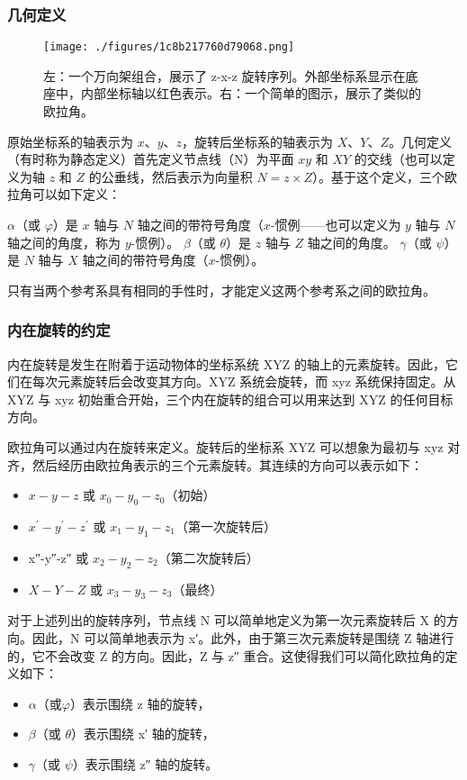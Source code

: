 \subsubsection{几何定义}  
\begin{figure}[ht]
\centering
\texttt{[image: ./figures/1c8b217760d79068.png]}
\caption{左：一个万向架组合，展示了 z-x-z 旋转序列。外部坐标系显示在底座中，内部坐标轴以红色表示。右：一个简单的图示，展示了类似的欧拉角。} \label{fig_OLJ_2}
\end{figure}
原始坐标系的轴表示为 \(x\)、\(y\)、\(z\)，旋转后坐标系的轴表示为 \(X\)、\(Y\)、\(Z\)。几何定义（有时称为静态定义）首先定义节点线（N）为平面 \(xy\) 和 \(XY\) 的交线（也可以定义为轴 \(z\) 和 \(Z\) 的公垂线，然后表示为向量积 \(N = z \times Z\)）。基于这个定义，三个欧拉角可以如下定义：

\(\alpha\)（或 \(\varphi\)）是 \(x\) 轴与 \(N\) 轴之间的带符号角度（\(x\)-惯例——也可以定义为 \(y\) 轴与 \(N\) 轴之间的角度，称为 \(y\)-惯例）。  
\(\beta\)（或 \(\theta\)）是 \(z\) 轴与 \(Z\) 轴之间的角度。  
\(\gamma\)（或 \(\psi\)）是 \(N\) 轴与 \(X\) 轴之间的带符号角度（\(x\)-惯例）。  

只有当两个参考系具有相同的手性时，才能定义这两个参考系之间的欧拉角。

\subsubsection{内在旋转的约定}
内在旋转是发生在附着于运动物体的坐标系统 XYZ 的轴上的元素旋转。因此，它们在每次元素旋转后会改变其方向。XYZ 系统会旋转，而 xyz 系统保持固定。从 XYZ 与 xyz 初始重合开始，三个内在旋转的组合可以用来达到 XYZ 的任何目标方向。

欧拉角可以通过内在旋转来定义。旋转后的坐标系 XYZ 可以想象为最初与 xyz 对齐，然后经历由欧拉角表示的三个元素旋转。其连续的方向可以表示如下：
\begin{itemize}
\item $x-y-z$ 或 $x_0-y_0-z_0$（初始）  
\item $x^\prime-y^\prime-z^\prime$ 或 $x_1-y_1-z_1$（第一次旋转后）  
\item x″-y″-z″ 或 $x_2-y_2-z_2$（第二次旋转后）  
\item $X-Y-Z$ 或 $x_3-y_3-z_3$（最终）
\end{itemize}
对于上述列出的旋转序列，节点线 N 可以简单地定义为第一次元素旋转后 X 的方向。因此，N 可以简单地表示为 x′。此外，由于第三次元素旋转是围绕 Z 轴进行的，它不会改变 Z 的方向。因此，Z 与 z″ 重合。这使得我们可以简化欧拉角的定义如下：
\begin{itemize}
\item $\alpha$（或$\varphi$）表示围绕 z 轴的旋转，  
\item $\beta$（或 $\theta$）表示围绕 x′ 轴的旋转，  
\item $\gamma$（或 $\psi$）表示围绕 z″ 轴的旋转。
\end{itemize}
